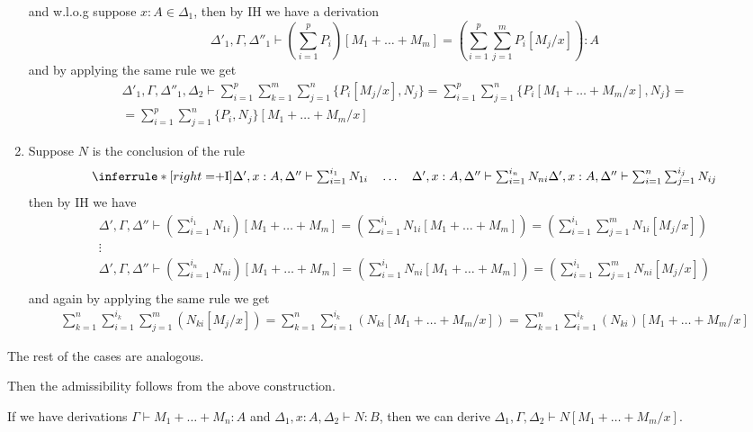 \documentclass[acmsmall,screen, nonacm, anonymous]{acmart}
\begin{document}
\begin{definition}[Substitution]
\begin{enumerate}
\[  \]
  and w.l.o.g suppose $x : A \in \Delta_1$, then by IH we have a derivation 
  \[
    \Delta'_1, \Gamma, \Delta''_1 \vdash (\sum_{i=1}^{p}P_i)[M_1 + \ldots + M_m] = (\sum_{i=1}^{p} \sum_{j=1}^{m}P_i[M_j / x]) : A
  \]
  and by applying the same rule we get
  \begin{gather*}
    \Delta'_1,\Gamma,\Delta''_1,\Delta_2 \vdash \sum_{i=1}^{p}\sum_{k=1}^{m}\sum_{j=1}^{n}\{P_i[M_j / x],N_j\} = \sum_{i=1}^{p}\sum_{j=1}^{n}\{P_i[M_1 + \ldots + M_m / x],N_j\} = \\
    = \sum_{i=1}^{p}\sum_{j=1}^{n}\{P_i,N_j\}[M_1 + \ldots + M_m / x]
  \end{gather*}
  \item Suppose $N$ is the conclusion of the rule
  \[
    \inferrule*[right=$+I$]{\Delta', x : A, \Delta'' \vdash \sum_{i=1}^{i_1} N_{1i} \quad \ldots \quad \Delta', x : A, \Delta'' \vdash \sum_{i=1}^{i_n} N_{ni}}{\Delta', x : A, \Delta'' \vdash \sum_{i=1}^{n}\sum_{j=1}^{i_j} N_{ij}}
  \]
  then by IH we have 
  \begin{gather*}
  \Delta',\Gamma,\Delta'' \vdash (\sum_{i=1}^{i_1}N_{1i})[M_1 + \ldots + M_m] = (\sum_{i=1}^{i_1}N_{1i}[M_1 + \ldots + M_m]) = (\sum_{i=1}^{i_1}\sum_{j=1}^{m}N_{1i}[M_j / x])\\
  \vdots\\
  \Delta',\Gamma,\Delta'' \vdash (\sum_{i=1}^{i_n}N_{ni})[M_1 + \ldots + M_m] = (\sum_{i=1}^{i_1}N_{ni}[M_1 + \ldots + M_m]) = (\sum_{i=1}^{i_1}\sum_{j=1}^{m}N_{ni}[M_j / x])\\
  \end{gather*}
  and again by applying the same rule we get
  \begin{gather*}
    \sum_{k=1}^{n}\sum_{i=1}^{i_k}\sum_{j=1}^{m}(N_{ki}[M_j / x]) = \sum_{k=1}^{n}\sum_{i=1}^{i_k}(N_{ki}[M_1 + \ldots + M_m / x]) = \sum_{k=1}^{n}\sum_{i=1}^{i_k}(N_{ki})[M_1 + \ldots + M_m / x]
  \end{gather*}
  \end{enumerate}
  The rest of the cases are analogous.
\end{definition}

Then the admissibility follows from the above construction.
\begin{lemma}
  If we have derivations $\Gamma \vdash M_1 + \ldots + M_n : A$ and $\Delta_1, x : A, \Delta_2 \vdash N : B$, then we can derive $\Delta_1, \Gamma, \Delta_2 \vdash N[M_1 + \ldots + M_m / x]$.
\end{lemma}
\end{document}
